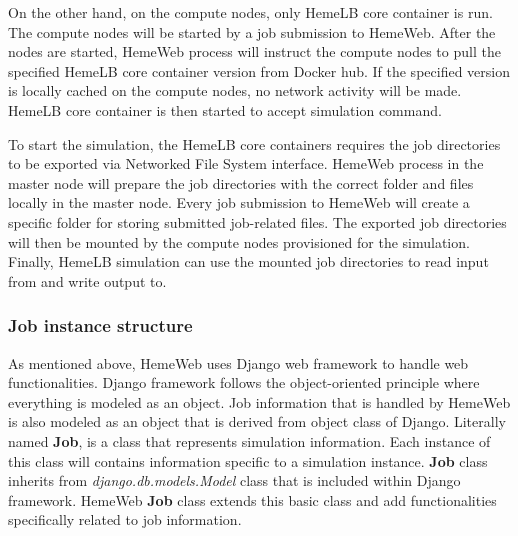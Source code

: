 On the other hand, on the compute nodes, only HemeLB core container is run. The compute nodes will be started by a job submission to HemeWeb. After the nodes are started, HemeWeb process will instruct the compute nodes to pull the specified HemeLB core container version from Docker hub. If the specified version is locally cached on the compute nodes, no network activity will be made. HemeLB core container is then started to accept simulation command.

To start the simulation, the HemeLB core containers requires the job directories to be exported via Networked File System interface. HemeWeb process in the master node will prepare the job directories with the correct folder and files locally in the master node. Every job submission to HemeWeb will create a specific folder for storing submitted job-related files. The exported job directories will then be mounted by the compute nodes provisioned for the simulation. Finally, HemeLB simulation can use the mounted job directories to read input from and write output to.


\subsubsection{Job instance structure}

As mentioned above, HemeWeb uses Django web framework to handle web functionalities. Django framework follows the object-oriented principle where everything is modeled as an object. Job information that is handled by HemeWeb is also modeled as an object that is derived from object class of Django. Literally named \textbf{Job}, is a class that represents simulation information. Each instance of this class will contains information specific to a simulation instance. \textbf{Job} class inherits from \textit{django.db.models.Model} class that is included within Django framework. HemeWeb \textbf{Job} class extends this basic class and add functionalities specifically related to job information.



